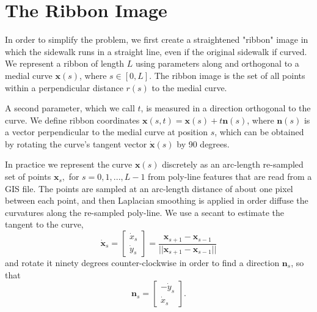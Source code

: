 \section{The Ribbon Image}

In order to simplify the problem, we first create a straightened "ribbon" image in which the sidewalk runs in a straight line, even if the original sidewalk if curved.
We represent a ribbon of length $L$ using parameters along and orthogonal to a medial curve $\mathbf{x}(s)$, where $s \in [0, L]$. The ribbon image is the set of all points within a perpendicular distance $r(s)$ to the medial curve.

A second parameter, which we call $t$, is measured in a direction orthogonal to the curve.  
We define ribbon coordinates $\mathbf{x}(s, t) = \mathbf{x}(s) + t\mathbf{n}(s)$, where $\mathbf{n}(s)$ is a vector perpendicular to the medial curve at position $s$, which can be obtained by rotating the curve's tangent vector $\dot{\mathbf{x}}(s)$ by 90 degrees. 


In practice we represent the curve $\mathbf{x}(s)$ discretely as an arc-length re-sampled set of points $\mathbf{x}_s,$ for $s=0,1,...,L-1$ from poly-line features that are read from a GIS file. The points are sampled at an arc-length distance of about one pixel between each point, and then Laplacian smoothing is applied in order diffuse the curvatures along the re-sampled poly-line.  
We use a secant to estimate the tangent to the curve,
\[\dot{\mathbf{x}}_s = \left[\begin{array}{c} \dot{x}_s \\ \dot{y}_s \end{array}\right]= \frac{\mathbf{x}_{s+1}-\mathbf{x}_{s-1}}{||\mathbf{x}_{s+1}-\mathbf{x}_{s-1}||} \] and rotate it ninety degrees counter-clockwise in order to find a direction  $\mathbf{n}_s$, so that 
\[\mathbf{n}_s = \left[\begin{array}{c} -\dot{y}_s \\ \dot{x}_s \end{array}\right]. \]


